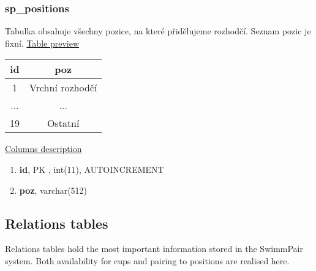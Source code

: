 \subsubsection*{sp\_positions}
Tabulka obsahuje všechny pozice, na které přidělujeme rozhodčí. Seznam pozic je fixní.
\newline
\underline{Table preview}
\begin{center}
 \begin{tabular}{||c c||} 
 \hline
 id & poz  \\ [0.5ex] 
 \hline\hline
 1 & Vrchní rozhodčí \\ 
 \hline
 ... & ...  \\ 
\hline
 19 & Ostatní  \\ [1ex] 
 \hline
\end{tabular}
\end{center}
\underline{Columns description}
\begin{enumerate}
  \setlength\itemsep{0em}
  \item \textbf{id}, PK , int(11), AUTOINCREMENT
  \item \textbf{poz}, varchar(512)
\end{enumerate}

\subsection{Relations tables}
Relations tables hold the most important information stored in the SwimmPair system. Both availability for cups and pairing to positions are realised here.
